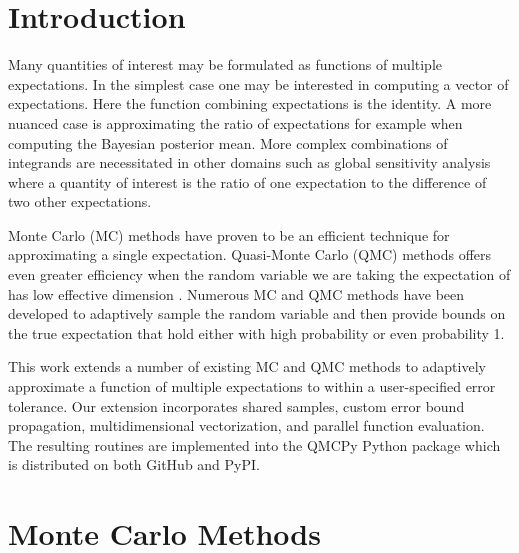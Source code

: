 \documentclass{article}[12pt]
\begin{document}
\newpage

\section{Introduction}

Many quantities of interest may be formulated as functions of multiple expectations. In the simplest case one may be interested in computing a vector of expectations. Here the function combining expectations is the identity. A more nuanced case is approximating the ratio of expectations for example when computing the Bayesian posterior mean. More complex combinations of integrands are necessitated in other domains such as global sensitivity analysis where a quantity of interest is the ratio of one expectation to the difference of two other expectations.

Monte Carlo (MC) methods have proven to be an efficient technique for approximating a single expectation. Quasi-Monte Carlo (QMC) methods  offers even greater efficiency when the random variable we are taking the expectation of has low effective dimension . Numerous MC and QMC methods have been developed to adaptively sample the random variable and then provide bounds on the true expectation that hold either with high probability or even probability 1. 

This work extends a number of existing MC and QMC methods to adaptively approximate a function of multiple expectations to within a user-specified error tolerance. Our extension incorporates shared samples, custom error bound propagation, multidimensional vectorization, and parallel function evaluation. The resulting routines are implemented into the QMCPy Python package \cite{QMCPy} which is distributed on both GitHub and PyPI. 

\section{Monte Carlo Methods}
\end{document}
